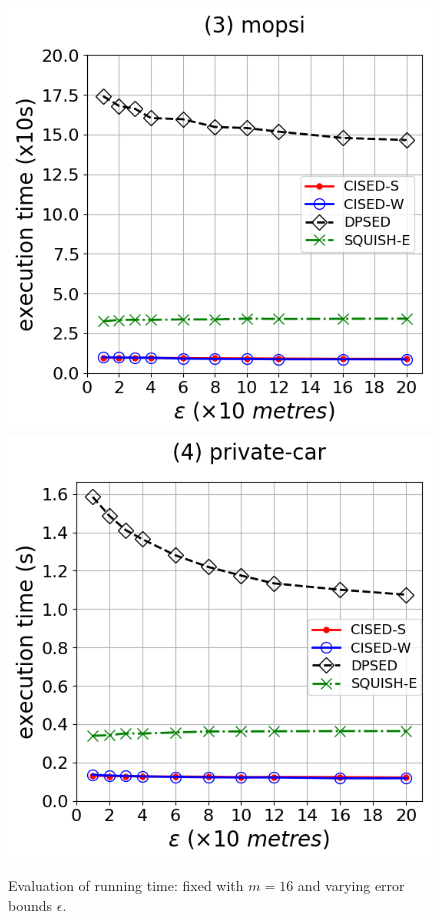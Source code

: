 {\begin{figure}[tb!]
\includegraphics[scale = 0.290]{Figures/Exp-time-epsilon-mopsi.png}\hspace{1ex}
\includegraphics[scale = 0.290]{Figures/Exp-time-epsilon-private.png}
\caption{\small Evaluation of running time: fixed with $m=16$ and varying error bounds $\epsilon$.}
\label{fig:time-epsilon}
\end{figure}





}
